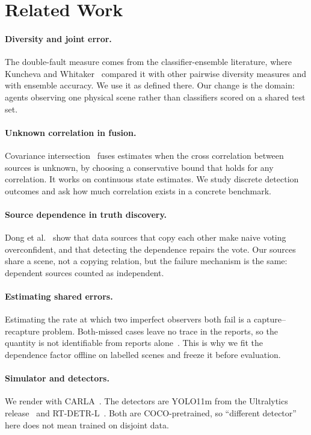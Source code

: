 \section{Related Work}

\paragraph{Diversity and joint error.}
The double-fault measure comes from the classifier-ensemble literature, where
Kuncheva and Whitaker~\cite{kuncheva2003} compared it with other pairwise
diversity measures and with ensemble accuracy. We use it as defined there. Our
change is the domain: agents observing one physical scene rather than
classifiers scored on a shared test set.

\paragraph{Unknown correlation in fusion.}
Covariance intersection~\cite{julier1997} fuses estimates when the cross
correlation between sources is unknown, by choosing a conservative bound that
holds for any correlation. It works on continuous state estimates. We study
discrete detection outcomes and ask how much correlation exists in a concrete
benchmark.

\paragraph{Source dependence in truth discovery.}
Dong et al.~\cite{dong2009} show that data sources that copy each other make
naive voting overconfident, and that detecting the dependence repairs the
vote. Our sources share a scene, not a copying relation, but the failure
mechanism is the same: dependent sources counted as independent.

\paragraph{Estimating shared errors.}
Estimating the rate at which two imperfect observers both fail is a
capture--recapture problem. Both-missed cases leave no trace in the reports,
so the quantity is not identifiable from reports alone~\cite{albert2004}.
This is why we fit the dependence factor offline on labelled scenes and
freeze it before evaluation.

\paragraph{Simulator and detectors.}
We render with CARLA~\cite{dosovitskiy2017}. The detectors are YOLO11m from the
Ultralytics release~\cite{ultralytics2024} and RT-DETR-L~\cite{zhao2024}. Both
are COCO-pretrained, so ``different detector'' here does not mean trained on
disjoint data.
